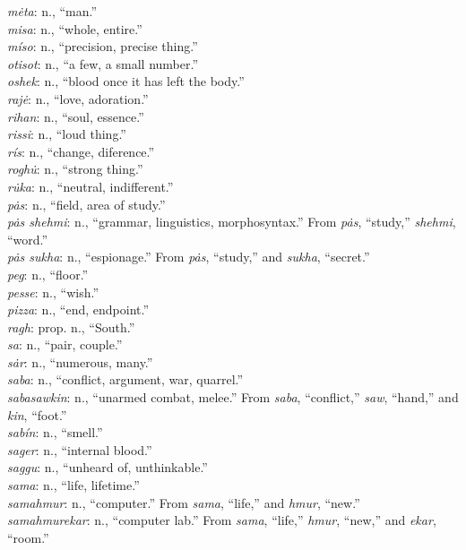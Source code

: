 \documentclass{article}[10pt]
\begin{document}
\begin{multicols}{3}
\emph{m\.{e}ta}: n., ``man.''\\
\emph{misa}: n., ``whole, entire.''\\
\emph{m\'{i}so}: n., ``precision, precise thing.''\\
\emph{otisot}: n., ``a few, a small number.''\\
\emph{oshek}: n., ``blood once it has left the body.''\\
\emph{raj\.{e}}: n., ``love, adoration.''\\
\emph{rihan}: n., ``soul, essence.''\\
\emph{rissi}: n., ``loud thing.''\\
\emph{r\'{i}s}: n., ``change, diference.''\\
\emph{rogh\.{u}}: n., ``strong thing.''\\
\emph{r\.{u}ka}: n., ``neutral, indifferent.''\\
\emph{p\.{a}s}: n., ``field, area of study.''\\
\emph{p\.{a}s shehmi}: n., ``grammar, linguistics, morphosyntax.'' From \emph{p\.{a}s}, ``study,'' \emph{shehmi}, ``word.''\\
\emph{p\.{a}s sukha}: n., ``espionage.'' From \emph{p\.{a}s}, ``study,'' and \emph{sukha}, ``secret.''\\
\emph{peg}: n., ``floor.''\\
\emph{pesse}: n., ``wish.''\\
\emph{pizza}: n., ``end, endpoint.''\\
\emph{ragh}: prop. n., ``South.''\\
\emph{sa}: n., ``pair, couple.''\\
\emph{s\.{a}r}: n., ``numerous, many.''\\
\emph{saba}: n., ``conflict, argument, war, quarrel.''\\
\emph{sabasawkin}: n., ``unarmed combat, melee.'' From \emph{saba}, ``conflict,'' \emph{saw}, ``hand,'' and \emph{kin}, ``foot.''\\
\emph{sab\'{i}n}: n., ``smell.''\\
\emph{sager}: n., ``internal blood.''\\
\emph{saggu}: n., ``unheard of, unthinkable.''\\
\emph{sama}: n., ``life, lifetime.''\\
\emph{samahmur}: n., ``computer.'' From \emph{sama}, ``life,'' and \emph{hmur}, ``new.''\\
\emph{samahmurekar}: n., ``computer lab.'' From \emph{sama}, ``life,'' \emph{hmur}, ``new,'' and \emph{ekar}, ``room.''\\

\end{multicols}
\end{document}
